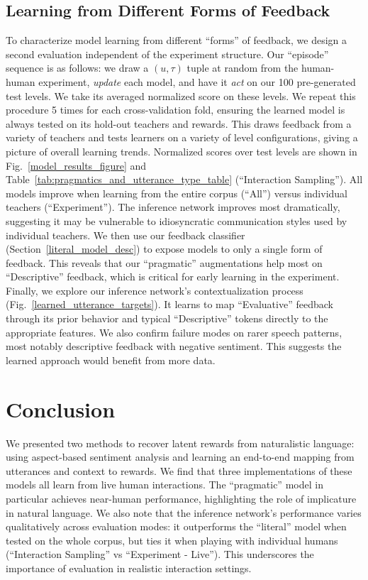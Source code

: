 \documentclass[letterpaper]{article} %
\begin{document}
\subsection{Learning from Different Forms of Feedback}
\label{random_sample_interactions}
\label{feedback_types}
To characterize model learning from different ``forms'' of feedback, we design a second evaluation independent of the experiment structure. Our ``episode'' sequence is as follows: we draw a $(u, \tau)$ tuple at random from the human-human experiment, \emph{update} each model, and have it \emph{act} on our 100 pre-generated test levels. We take its averaged normalized score on these levels. We repeat this procedure 5 times for each cross-validation fold, ensuring the learned model is always tested on its hold-out teachers and rewards. This draws feedback from a variety of teachers and tests learners on a variety of level configurations, giving a picture of overall learning trends. Normalized scores over test levels are shown in Fig.~\ref{model_results_figure} and Table~\ref{tab:pragmatics_and_utterance_type_table} (``Interaction Sampling''). All models improve when learning from the entire corpus (``All'') versus individual teachers (``Experiment''). The inference network improves most dramatically, suggesting it may be vulnerable to idiosyncratic communication styles used by individual teachers. We then use our feedback classifier (Section~\ref{literal_model_desc}) to expose models to only a single form of feedback. This reveals that our ``pragmatic'' augmentations help most on ``Descriptive'' feedback, which is critical for early learning in the experiment. Finally, we explore our inference network's contextualization process (Fig.~\ref{learned_utterance_targets}). It learns to map ``Evaluative'' feedback through its prior behavior and typical ``Descriptive'' tokens directly to the appropriate features. We also confirm failure modes on rarer speech patterns, most notably descriptive feedback with negative sentiment. This suggests the learned approach would benefit from more data.

\section{Conclusion}
\label{conclusion_section}
We presented two methods to recover latent rewards from naturalistic language: using aspect-based sentiment analysis and learning an end-to-end mapping from utterances and context to rewards. We find that three implementations of these models all learn from live human interactions. The ``pragmatic'' model in particular achieves near-human performance, highlighting the role of implicature in natural language. We also note that the inference network's performance varies qualitatively across evaluation modes: it outperforms the ``literal'' model when tested on the whole corpus, but ties it when playing with individual humans (``Interaction Sampling'' vs ``Experiment - Live''). This underscores the importance of evaluation in realistic interaction settings.
\end{document}
